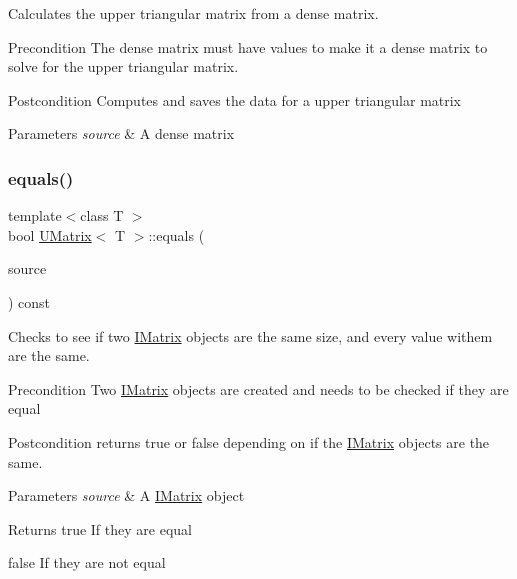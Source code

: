 Calculates the upper triangular matrix from a dense matrix. 

\begin{DoxyPrecond}{Precondition}
The dense matrix must have values to make it a dense matrix to solve for the upper triangular matrix. 
\end{DoxyPrecond}
\begin{DoxyPostcond}{Postcondition}
Computes and saves the data for a upper triangular matrix
\end{DoxyPostcond}

\begin{DoxyParams}{Parameters}
{\em source} & A dense matrix \\
\hline
\end{DoxyParams}
\mbox{\label{class_u_matrix_aed1576427a21090fe55e9993e7f2f72f}} 
\subsubsection{\texorpdfstring{equals()}{equals()}\hspace{0.1cm}{\footnotesize\ttfamily [1/6]}}
{\footnotesize\ttfamily template$<$class T $>$ \\
bool \mbox{\hyperlink{class_u_matrix}{U\+Matrix}}$<$ T $>$\+::equals (\begin{DoxyParamCaption}\item[{const \mbox{\hyperlink{class_i_matrix}{I\+Matrix}}$<$ \mbox{\hyperlink{class_matrix}{Matrix}}$<$ T $>$, T $>$ \&}]{source }\end{DoxyParamCaption}) const}



Checks to see if two \mbox{\hyperlink{class_i_matrix}{I\+Matrix}} objects are the same size, and every value withem are the same. 

\begin{DoxyPrecond}{Precondition}
Two \mbox{\hyperlink{class_i_matrix}{I\+Matrix}} objects are created and needs to be checked if they are equal 
\end{DoxyPrecond}
\begin{DoxyPostcond}{Postcondition}
returns true or false depending on if the \mbox{\hyperlink{class_i_matrix}{I\+Matrix}} objects are the same.
\end{DoxyPostcond}

\begin{DoxyParams}{Parameters}
{\em source} & A \mbox{\hyperlink{class_i_matrix}{I\+Matrix}} object \\
\hline
\end{DoxyParams}
\begin{DoxyReturn}{Returns}
true If they are equal 

false If they are not equal 
\end{DoxyReturn}
\mbox{\label{class_u_matrix_a12dfc33238c78fafac50c6da51e5563a}} 
